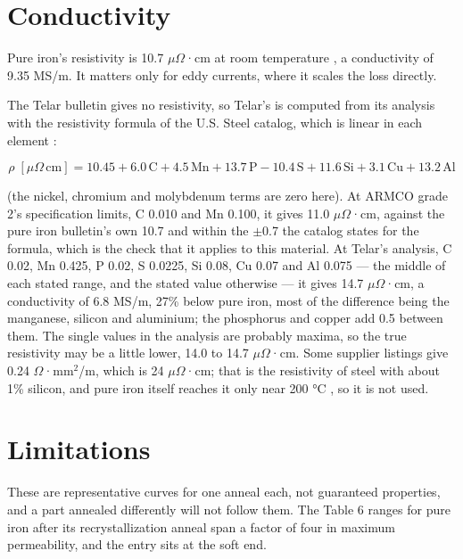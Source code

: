 \documentclass[
  11pt,
]{article}
\begin{document}
\section{Conductivity}\label{conductivity}

Pure iron's resistivity is 10.7 \(\mu\Omega\)·cm at room temperature \cite{armco-iron}, a conductivity of 9.35 MS/m. It matters only for eddy currents, where it scales the loss directly.

The Telar bulletin gives no resistivity, so Telar's is computed from its analysis with the resistivity formula of the U.S. Steel catalog, which is linear in each element \cite{meeker-silicon}:

\begin{equation}\label{eq:rho}
\rho\;[\mu\Omega\,\mathrm{cm}] = 10.45 + 6.0\,\mathrm{C} + 4.5\,\mathrm{Mn} + 13.7\,\mathrm{P} - 10.4\,\mathrm{S} + 11.6\,\mathrm{Si} + 3.1\,\mathrm{Cu} + 13.2\,\mathrm{Al}
\end{equation}

(the nickel, chromium and molybdenum terms are zero here). At ARMCO grade 2's specification limits, C 0.010 and Mn 0.100, it gives 11.0 \(\mu\Omega\)·cm, against the pure iron bulletin's own 10.7 and within the \(\pm\)0.7 the catalog states for the formula, which is the check that it applies to this material. At Telar's analysis, C 0.02, Mn 0.425, P 0.02, S 0.0225, Si 0.08, Cu 0.07 and Al 0.075 --- the middle of each stated range, and the stated value otherwise --- it gives 14.7 \(\mu\Omega\)·cm, a conductivity of 6.8 MS/m, 27\% below pure iron, most of the difference being the manganese, silicon and aluminium; the phosphorus and copper add 0.5 between them. The single values in the analysis are probably maxima, so the true resistivity may be a little lower, 14.0 to 14.7 \(\mu\Omega\)·cm. Some supplier listings give 0.24 \(\Omega\)·mm\(^2\)/m, which is 24 \(\mu\Omega\)·cm; that is the resistivity of steel with about 1\% silicon, and pure iron itself reaches it only near 200 °C \cite{armco-iron}, so it is not used.

\section{Limitations}\label{limitations}

These are representative curves for one anneal each, not guaranteed properties, and a part annealed differently will not follow them. The Table 6 ranges for pure iron after its recrystallization anneal span a factor of four in maximum permeability, and the entry sits at the soft end.
\end{document}
